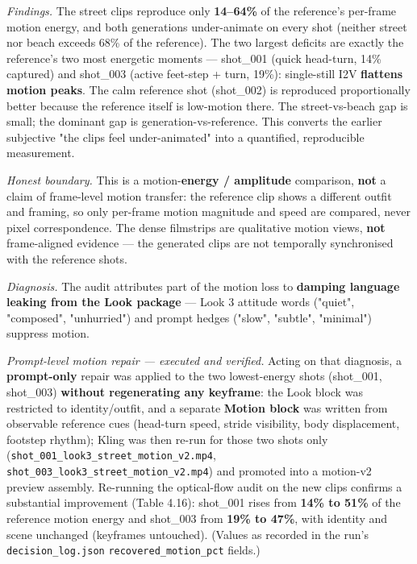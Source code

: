 \documentclass[10pt,twocolumn,letterpaper]{article}
\begin{document}
\emph{Findings.} The street clips reproduce only \textbf{14--64\%} of the reference's per-frame motion energy, and both generations under-animate on every shot (neither street nor beach exceeds 68\% of the reference). The two largest deficits are exactly the reference's two most energetic moments --- shot\_001 (quick head-turn, 14\% captured) and shot\_003 (active feet-step + turn, 19\%): single-still I2V \textbf{flattens motion peaks}. The calm reference shot (shot\_002) is reproduced proportionally better because the reference itself is low-motion there. The street-vs-beach gap is small; the dominant gap is generation-vs-reference. This converts the earlier subjective "the clips feel under-animated" into a quantified, reproducible measurement.

\emph{Honest boundary.} This is a motion-\textbf{energy / amplitude} comparison, \textbf{not} a claim of frame-level motion transfer: the reference clip shows a different outfit and framing, so only per-frame motion magnitude and speed are compared, never pixel correspondence. The dense filmstrips are qualitative motion views, \textbf{not} frame-aligned evidence --- the generated clips are not temporally synchronised with the reference shots.

\emph{Diagnosis.} The audit attributes part of the motion loss to \textbf{damping language leaking from the Look package} --- Look 3 attitude words ("quiet", "composed", "unhurried") and prompt hedges ("slow", "subtle", "minimal") suppress motion.

\emph{Prompt-level motion repair --- executed and verified.} Acting on that diagnosis, a \textbf{prompt-only} repair was applied to the two lowest-energy shots (shot\_001, shot\_003) \textbf{without regenerating any keyframe}: the Look block was restricted to identity/outfit, and a separate \textbf{Motion block} was written from observable reference cues (head-turn speed, stride visibility, body displacement, footstep rhythm); Kling was then re-run for those two shots only (\texttt{shot\_001\_look3\_street\_motion\_v2.mp4}, \texttt{shot\_003\_look3\_street\_motion\_v2.mp4}) and promoted into a motion-v2 preview assembly. Re-running the optical-flow audit on the new clips confirms a substantial improvement (Table 4.16): shot\_001 rises from \textbf{14\% to 51\%} of the reference motion energy and shot\_003 from \textbf{19\% to 47\%}, with identity and scene unchanged (keyframes untouched). (Values as recorded in the run's \texttt{decision\_log.json} \texttt{recovered\_motion\_pct} fields.)
\end{document}
